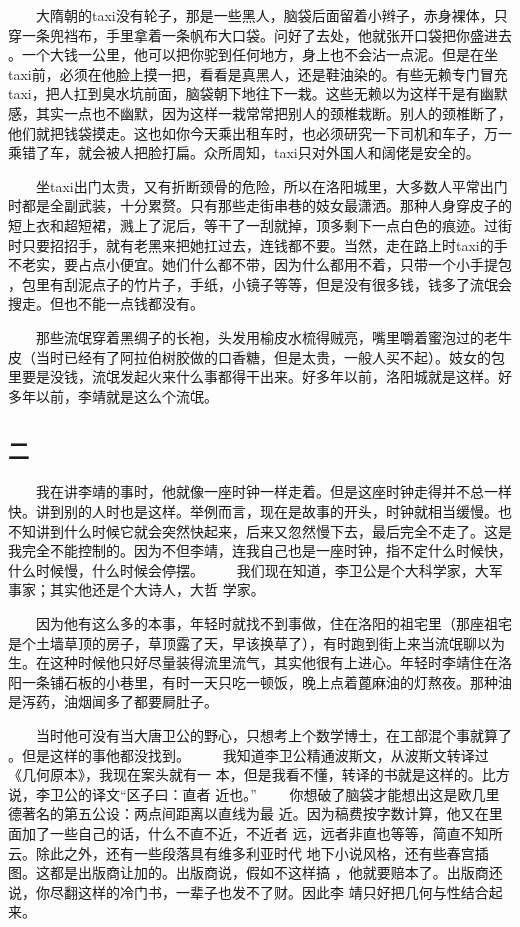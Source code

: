 　　大隋朝的taxi没有轮子，那是一些黑人，脑袋后面留着小辫子，赤身裸体，只 穿一条兜裆布，手里拿着一条帆布大口袋。问好了去处，他就张开口袋把你盛进去 。一个大钱一公里，他可以把你驼到任何地方，身上也不会沾一点泥。但是在坐 taxi前，必须在他脸上摸一把，看看是真黑人，还是鞋油染的。有些无赖专门冒充 taxi，把人扛到臭水坑前面，脑袋朝下地往下一栽。这些无赖以为这样干是有幽默 感，其实一点也不幽默，因为这样一栽常常把别人的颈椎栽断。别人的颈椎断了， 他们就把钱袋摸走。这也如你今天乘出租车时，也必须研究一下司机和车子，万一 乘错了车，就会被人把脸打扁。众所周知，taxi只对外国人和阔佬是安全的。 

　　坐taxi出门太贵，又有折断颈骨的危险，所以在洛阳城里，大多数人平常出门 时都是全副武装，十分累赘。只有那些走街串巷的妓女最潇洒。那种人身穿皮子的 短上衣和超短裙，溅上了泥后，等干了一刮就掉，顶多剩下一点白色的痕迹。过街 时只要招招手，就有老黑来把她扛过去，连钱都不要。当然，走在路上时taxi的手 不老实，要占点小便宜。她们什么都不带，因为什么都用不着，只带一个小手提包 ，包里有刮泥点子的竹片子，手纸，小镜子等等，但是没有很多钱，钱多了流氓会 搜走。但也不能一点钱都没有。

 　　那些流氓穿着黑绸子的长袍，头发用榆皮水梳得贼亮，嘴里嚼着蜜泡过的老牛 皮（当时已经有了阿拉伯树胶做的口香糖，但是太贵，一般人买不起）。妓女的包 里要是没钱，流氓发起火来什么事都得干出来。好多年以前，洛阳城就是这样。好 多年以前，李靖就是这么个流氓。 
 
 
\subsection{二}
 
 　　我在讲李靖的事时，他就像一座时钟一样走着。但是这座时钟走得并不总一样快。讲到别的人时也是这样。举例而言，现在是故事的开头，时钟就相当缓慢。也 不知讲到什么时候它就会突然快起来，后来又忽然慢下去，最后完全不走了。这是 我完全不能控制的。因为不但李靖，连我自己也是一座时钟，指不定什么时候快， 什么时候慢，什么时候会停摆。 　　我们现在知道，李卫公是个大科学家，大军事家；其实他还是个大诗人，大哲 学家。

 　　因为他有这么多的本事，年轻时就找不到事做，住在洛阳的祖宅里（那座祖宅 是个土墙草顶的房子，草顶露了天，早该换草了），有时跑到街上来当流氓聊以为 生。在这种时候他只好尽量装得流里流气，其实他很有上进心。年轻时李靖住在洛 阳一条铺石板的小巷里，有时一天只吃一顿饭，晚上点着蓖麻油的灯熬夜。那种油 是泻药，油烟闻多了都要屙肚子。

 　　当时他可没有当大唐卫公的野心，只想考上个数学博士，在工部混个事就算了 。但是这样的事他都没找到。 　　我知道李卫公精通波斯文，从波斯文转译过《几何原本》，我现在案头就有一 本，但是我看不懂，转译的书就是这样的。比方说，李卫公的译文“区子曰：直者 近也。” 　　你想破了脑袋才能想出这是欧几里德著名的第五公设：两点间距离以直线为最 近。因为稿费按字数计算，他又在里面加了一些自己的话，什么不直不近，不近者 远，远者非直也等等，简直不知所云。除此之外，还有一些段落具有维多利亚时代 地下小说风格，还有些春宫插图。这都是出版商让加的。出版商说，假如不这样搞 ，他就要赔本了。出版商还说，你尽翻这样的冷门书，一辈子也发不了财。因此李 靖只好把几何与性结合起来。 

